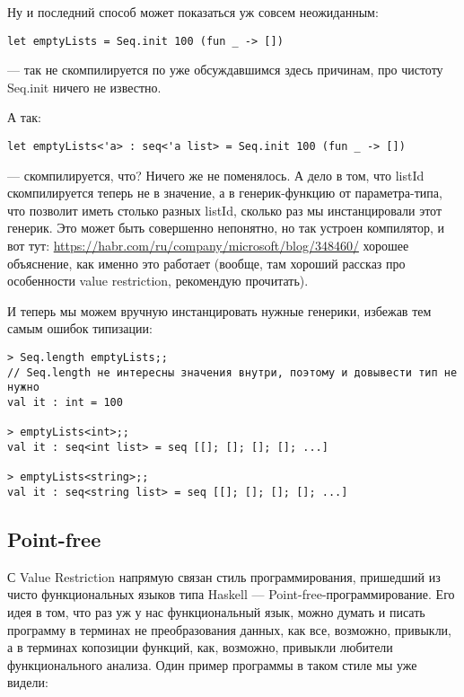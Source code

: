 \documentclass[a5paper]{article}
\begin{document}
Ну и последний способ может показаться уж совсем неожиданным:

\begin{verbatim}
let emptyLists = Seq.init 100 (fun _ -> [])
\end{verbatim}

--- так не скомпилируется по уже обсуждавшимся здесь причинам, про чистоту Seq.init ничего не известно.

А так:

\begin{verbatim}
let emptyLists<'a> : seq<'a list> = Seq.init 100 (fun _ -> [])
\end{verbatim}

--- скомпилируется, что? Ничего же не поменялось. А дело в том, что listId скомпилируется теперь не в значение, а в генерик-функцию от параметра-типа, что позволит иметь столько разных listId, сколько раз мы инстанцировали этот генерик. Это может быть совершенно непонятно, но так устроен компилятор, и вот тут: \url{https://habr.com/ru/company/microsoft/blog/348460/} хорошее объяснение, как именно это работает (вообще, там хороший рассказ про особенности value restriction, рекомендую прочитать).

И теперь мы можем вручную инстанцировать нужные генерики, избежав тем самым ошибок типизации:

\begin{verbatim}
> Seq.length emptyLists;;
// Seq.length не интересны значения внутри, поэтому и довывести тип не нужно
val it : int = 100

> emptyLists<int>;;
val it : seq<int list> = seq [[]; []; []; []; ...]

> emptyLists<string>;;
val it : seq<string list> = seq [[]; []; []; []; ...]
\end{verbatim}

\subsection{Point-free}

С Value Restriction напрямую связан стиль программирования, пришедший из чисто функциональных языков типа Haskell --- Point-free-программирование. Его идея в том, что раз уж у нас функциональный язык, можно думать и писать программу в терминах не преобразования данных, как все, возможно, привыкли, а в терминах копозиции функций, как, возможно, привыкли любители функционального анализа. Один пример программы в таком стиле мы уже видели:
\end{document}
